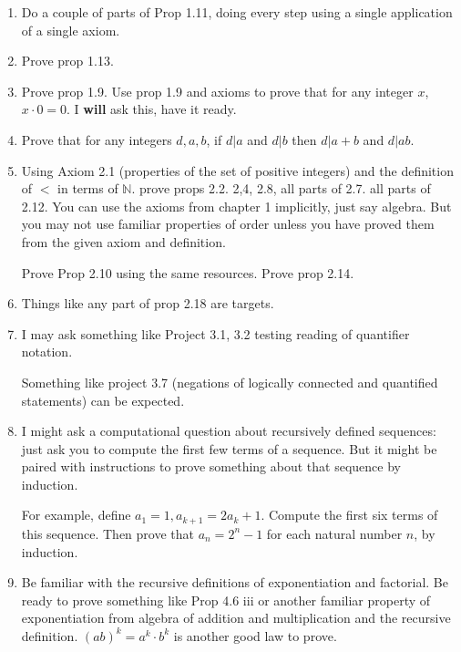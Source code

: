 \documentclass[12pt]{article}
\begin{document}
\begin{enumerate}

\item  Do a couple of parts of Prop 1.11, doing every step using a single application of a single axiom.

\item  Prove prop 1.13.

\item  Prove prop 1.9.  Use prop 1.9 and axioms to prove that for any integer $x$, $x \cdot 0 = 0$.  I {\bf will} ask this, have it ready.


\item  Prove that for any integers $d,a,b$, if $d|a$ and $d|b$ then $d|a+b$ and $d|ab$.

\item  Using Axiom 2.1 (properties of the set of positive integers) and the definition of $<$ in terms of $\mathbb N$. prove
props 2.2. 2,4, 2.8, all parts of 2.7.  all parts of 2.12.  You can use the axioms from chapter 1 implicitly, just say algebra.  But you may not use familiar properties of order unless you have proved them from the given axiom and definition.

Prove Prop 2.10 using the same resources.  Prove prop 2.14.

\item  Things like any part of prop 2.18 are targets.

\item  I may ask something like Project 3.1, 3.2 testing reading of quantifier notation.

Something like project 3.7 (negations of logically connected and quantified statements) can be expected.

\item  I might ask a computational question about recursively defined sequences:  just ask you to compute the first few terms of a sequence.
But it might be paired with instructions to prove something about that sequence by induction.

For example, define $a_1 = 1, a_{k+1} = 2a_k+1$.  Compute the first six terms of this sequence.  Then prove that $a_n = 2^n-1$ for each natural number $n$, by induction.

\item  Be familiar with the recursive definitions of exponentiation and factorial.  Be ready to prove something like Prop 4.6 iii or another familiar property of exponentiation from algebra of addition and multiplication and the recursive definition.  $(ab)^k = a^k\cdot b^k$ is another good law to prove.


\end{enumerate}
\end{document}
